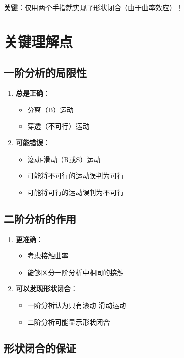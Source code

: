 \documentclass[12pt,a4paper]{article}
\begin{document}
\textbf{关键}：仅用两个手指就实现了形状闭合（由于曲率效应）！

\section{关键理解点}

\subsection{一阶分析的局限性}

\begin{enumerate}
\item \textbf{总是正确}：
   \begin{itemize}
   \item 分离（B）运动
   \item 穿透（不可行）运动
   \end{itemize}

\item \textbf{可能错误}：
   \begin{itemize}
   \item 滚动-滑动（R或S）运动
   \item 可能将不可行的运动误判为可行
   \item 可能将可行的运动误判为不可行
   \end{itemize}
\end{enumerate}

\subsection{二阶分析的作用}

\begin{enumerate}
\item \textbf{更准确}：
   \begin{itemize}
   \item 考虑接触曲率
   \item 能够区分一阶分析中相同的接触
   \end{itemize}

\item \textbf{可以发现形状闭合}：
   \begin{itemize}
   \item 一阶分析认为只有滚动-滑动运动
   \item 二阶分析可能显示形状闭合
   \end{itemize}
\end{enumerate}

\subsection{形状闭合的保证}
\end{document}
